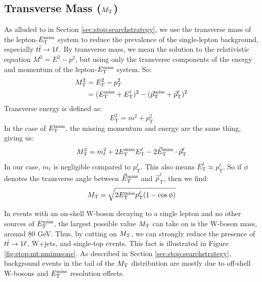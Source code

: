 \subsection{Transverse Mass (\texorpdfstring{$M_\text{T}$}{MT})}
\label{ssec:stop:mt}

As alluded to in Section \ref{sec:stop:searchstrategy}, we use the
transverse mass of the lepton-$E_\text{T}^\text{miss}$ system to reduce the prevalence of
the single-lepton background, especially $t\bar{t} \rightarrow 1\ell$. By transverse
mass, we mean the solution to the relativistic equation $M^2 = E^2 -
p^2$, but using only the transverse components of the energy and
momentum of the lepton-$E_\text{T}^\text{miss}$ system. So:
\begin{equation}
\begin{split}
M_\text{T}^2 & = E_T^2 - p_T^2 \\
 & = (E_\text{T}^\text{miss} + E_\text{T}^\ell)^2 - (\vec{p}_\text{T}^\text{miss} + \vec{p}_\text{T}^\ell)^2
\end{split}
\end{equation}
Transverse energy is defined as:
\begin{equation}
E_\text{T}^2 = m^2 + p_\text{T}^2
\end{equation}
In the case of $E_\text{T}^\text{miss}$, the missing momentum and energy are the same
thing, giving us:
\begin{equation}
M_\text{T}^2 = m_\ell^2 + 2E_\text{T}^\text{miss} E_\text{T}^\ell - 2 \vec{E}_\text{T}^\text{miss} \cdot \vec{p}_\text{T}^\ell
\end{equation}
In our case, $m_\ell$ is negligible compared to
$p_\text{T}^\ell$. This also means $E_\text{T}^\ell \approx p_\text{T}^\ell$.
So if $\phi$ denotes the transverse angle between $\vec{E}_\text{T}^\text{miss}$ and
$\vec{p}_\text{T}^\ell$, then we find:
\begin{equation}
\label{eq:stop:mt}
M_\text{T} = \sqrt{2 E_\text{T}^\text{miss} p_\text{T}^\ell (1 - \cos \phi)}
\end{equation}

In events with an on-shell W-boson decaying to a single lepton and no
other sources of $E_\text{T}^\text{miss}$, the largest possible value $M_\text{T}$ can take on
is the W-boson mass, around 80 GeV. Thus, by cutting on $M_\text{T}$, we can
strongly reduce the presence of $t\bar{t} \rightarrow 1\ell$, W+jets, and single-top
events. This fact is illustrated in Figure
\ref{fig:stop:mt:nminusone}. As described in Section
\ref{sec:stop:searchstrategy}, background events in the tail of the
$M_\text{T}$ distribution are mostly due to off-shell W-bosons and $E_\text{T}^\text{miss}$
resolution effects.

